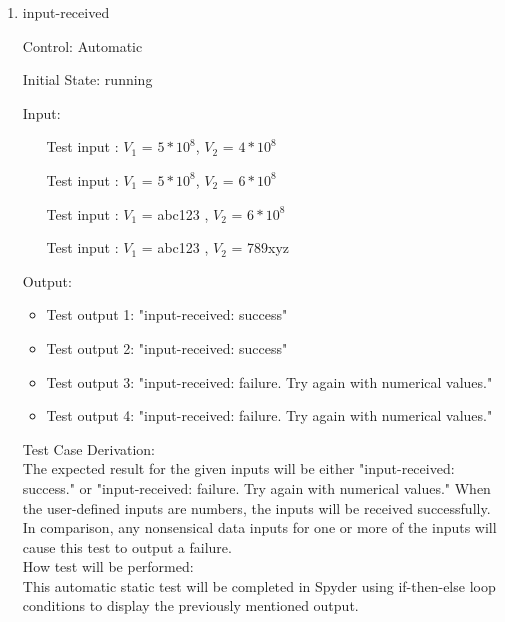 \documentclass[12pt, titlepage]{article}
\newcounter{tinnum} %
\begin{document}
\begin{enumerate}

\item{input-received\\}

Control: Automatic
					
Initial State: \progname{} running
					
Input:
\begin{itemize}
\item[Test input \refstepcounter{tinnum}\thetinnum\label{Tinput_3}:]$V_1$ = 
$5*10^8$, $V_2$ = $4*10^8$%

\item[Test input \refstepcounter{tinnum}\thetinnum\label{Tinput_4}:] $V_1$ = 
$5*10^8$, $V_2$ = $6*10^8$%

\item[Test input \refstepcounter{tinnum}\thetinnum\label{Tinput_5}:] $V_1$ = 
abc123 , $V_2$ = $6*10^8$  
\item[Test input \refstepcounter{tinnum}\thetinnum\label{Tinput_6}:] $V_1$ = 
abc123 , $V_2$ = 789xyz 
\end{itemize}

Output: 
\begin{itemize}
\item Test output 1: "input-received: success"
\item Test output 2: "input-received: success" 
\item Test output 3: "input-received: failure. Try again with numerical values."
\item Test output 4: "input-received: failure. Try again with numerical values."
\end{itemize}

Test Case Derivation:\\
The expected result for the given inputs will be either 
"input-received: success." or  "input-received: failure. Try again with 
numerical values." When the user-defined inputs are numbers, the inputs will be 
received successfully. In comparison, any nonsensical data inputs for one or 
more of the inputs will cause this test to output a failure.\\

How test will be performed: \\
This automatic static test will be completed in Spyder using if-then-else loop 
conditions to display the previously mentioned output. \\


\end{enumerate}
\end{document}
